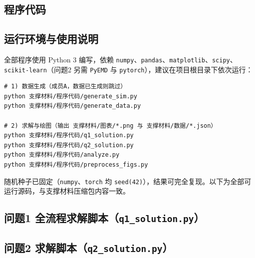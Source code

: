 \documentclass[withoutpreface]{cumcmthesis}
\begin{document}
\begin{appendices}
\section{程序代码}

\subsection{运行环境与使用说明}
\begin{sloppypar}
全部程序使用 Python 3 编写，依赖 \texttt{numpy}、\texttt{pandas}、\texttt{matplotlib}、\texttt{scipy}、\texttt{scikit-learn}（问题2 另需 \texttt{PyEMD} 与 \texttt{pytorch}），建议在项目根目录下依次运行：
\end{sloppypar}
\begin{verbatim}
# 1) 数据生成（成员A，数据已生成则跳过）
python 支撑材料/程序代码/generate_sim.py
python 支撑材料/程序代码/generate_data.py

# 2) 求解与绘图（输出 支撑材料/图表/*.png 与 支撑材料/数据/*.json）
python 支撑材料/程序代码/q1_solution.py
python 支撑材料/程序代码/q2_solution.py
python 支撑材料/程序代码/analyze.py
python 支撑材料/程序代码/preprocess_figs.py
\end{verbatim}
随机种子已固定（\texttt{numpy}、\texttt{torch} 均 \texttt{seed(42)}），结果可完全复现。以下为全部可运行源码，与支撑材料压缩包内容一致。

\renewcommand{\lstlistingname}{程序}

\subsection{问题1 全流程求解脚本（\texttt{q1\_solution.py}）}


\subsection{问题2 求解脚本（\texttt{q2\_solution.py}）}



\end{appendices}
\end{document}
